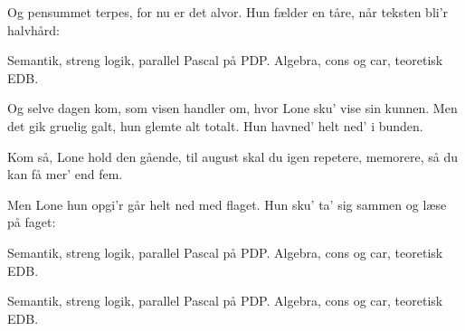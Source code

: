 \documentclass[a4paper,11pt]{article}
\begin{document}
\begin{song}
     Og pensummet terpes,
              for nu er det alvor.
              Hun fælder en tåre,
              når teksten bli'r halvhård:

     Semantik, streng logik,
                parallel Pascal på PDP.
                Algebra, cons og car,
                teoretisk EDB.

     Og selve dagen kom,
              som visen handler om,
              hvor Lone sku' vise sin kunnen.
              Men det gik gruelig galt,
              hun glemte alt totalt.
              Hun havned' helt ned' i bunden.
    
     Kom så, Lone
              hold den gående,
              til august skal du igen
              repetere,
              memorere,
              så du kan få mer' end fem.

     Men Lone hun opgi'r
              går helt ned med flaget.
              Hun sku' ta' sig sammen
              og læse på faget:

     Semantik, streng logik,
                parallel Pascal på PDP.
                Algebra, cons og car,
                teoretisk EDB.

     Semantik, streng logik,
                parallel Pascal på PDP.
                Algebra, cons og car,
                teoretisk EDB.
\end{song}
\end{document}

